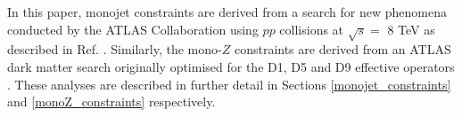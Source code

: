 In this paper, monojet constraints are derived from a search for new phenomena conducted by the ATLAS Collaboration using $pp$ collisions at $\sqrt{s}=$ 8 TeV as described in Ref. \cite{Aad:2015zva}. Similarly, the mono-$Z$ constraints are derived from an ATLAS dark matter search originally optimised for the D1, D5 and D9 effective operators \cite{Aad:2014monoZlep}. These analyses are described in further detail in Sections \ref{monojet_constraints} and \ref{monoZ_constraints} respectively.


\begin{figure}[ht!]
\begin{center}
\begin{subfigure}[b]{0.45\textwidth}
\centering
{}
\caption{}
\label{Signal_phen_sa}
\end{subfigure} \hspace{0.1cm}

\end{center}
\end{figure}
